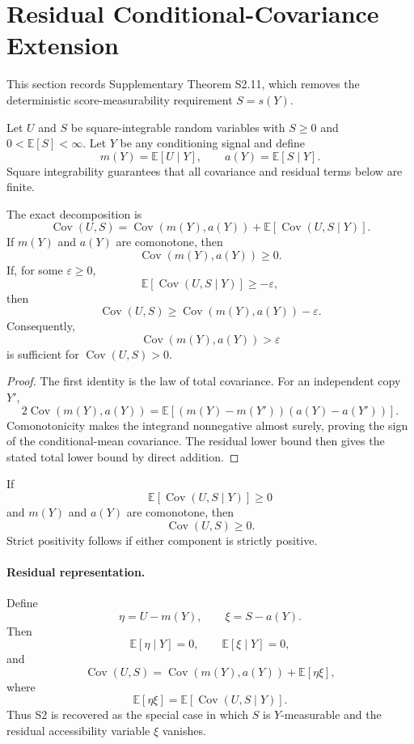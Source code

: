 \section{Residual Conditional-Covariance Extension}

This section records Supplementary Theorem S2.11, which removes the deterministic score-measurability requirement $S=s(Y)$.

Let $U$ and $S$ be square-integrable random variables with $S\ge0$ and $0<\mathbb E[S]<\infty$. Let $Y$ be any conditioning signal and define
\[
m(Y)=\mathbb E[U\mid Y],
\qquad
a(Y)=\mathbb E[S\mid Y].
\]
Square integrability guarantees that all covariance and residual terms below are finite.

\begin{theorem}
The exact decomposition is
\[
\operatorname{Cov}(U,S)
=
\operatorname{Cov}(m(Y),a(Y))
+
\mathbb E[\operatorname{Cov}(U,S\mid Y)].
\]
If $m(Y)$ and $a(Y)$ are comonotone, then
\[
\operatorname{Cov}(m(Y),a(Y))\ge0.
\]
If, for some $\varepsilon\ge0$,
\[
\mathbb E[\operatorname{Cov}(U,S\mid Y)]
\ge-\varepsilon,
\]
then
\[
\operatorname{Cov}(U,S)
\ge
\operatorname{Cov}(m(Y),a(Y))-\varepsilon.
\]
Consequently,
\[
\operatorname{Cov}(m(Y),a(Y))>\varepsilon
\]
is sufficient for $\operatorname{Cov}(U,S)>0$.
\end{theorem}

\begin{proof}
The first identity is the law of total covariance. For an independent copy $Y'$,
\[
2\operatorname{Cov}(m(Y),a(Y))
=
\mathbb E\!\left[
(m(Y)-m(Y'))(a(Y)-a(Y'))
\right].
\]
Comonotonicity makes the integrand nonnegative almost surely, proving the sign of the conditional-mean covariance. The residual lower bound then gives the stated total lower bound by direct addition.
\end{proof}

\begin{corollary}
If
\[
\mathbb E[\operatorname{Cov}(U,S\mid Y)]\ge0
\]
and $m(Y)$ and $a(Y)$ are comonotone, then
\[
\operatorname{Cov}(U,S)\ge0.
\]
Strict positivity follows if either component is strictly positive.
\end{corollary}

\paragraph{Residual representation.}
Define
\[
\eta=U-m(Y),
\qquad
\xi=S-a(Y).
\]
Then
\[
\mathbb E[\eta\mid Y]=0,
\qquad
\mathbb E[\xi\mid Y]=0,
\]
and
\[
\operatorname{Cov}(U,S)
=
\operatorname{Cov}(m(Y),a(Y))
+
\mathbb E[\eta\xi],
\]
where
\[
\mathbb E[\eta\xi]
=
\mathbb E[\operatorname{Cov}(U,S\mid Y)].
\]
Thus S2 is recovered as the special case in which $S$ is $Y$-measurable and the residual accessibility variable $\xi$ vanishes.

